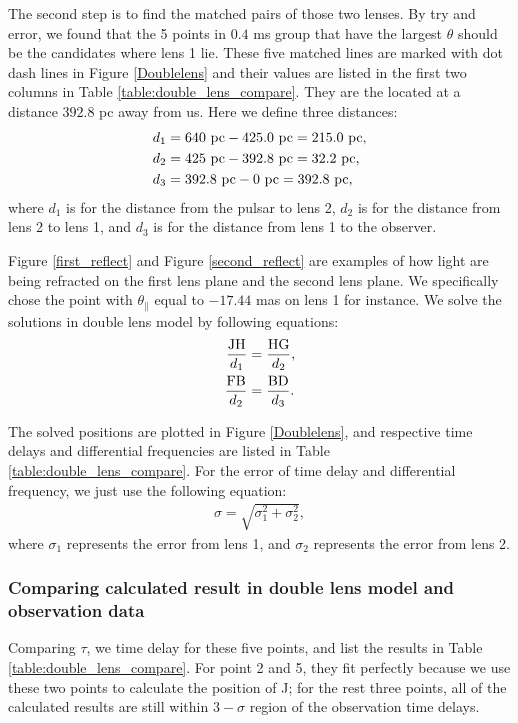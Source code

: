 \documentclass[useAMS,usenatbib]{mn2e}
\begin{document}
The second step is to find the matched pairs of those two lenses. By try and error, we found that the 5 points in $0.4$ ms group that have the largest $\theta$ should be the candidates where lens 1 lie.  These five matched lines are marked with dot dash lines in Figure \ref{Doublelens} and their values are listed in the first two columns in Table \ref{table:double_lens_compare}. They are the located at a distance $392.8$ pc away from us. Here we define three distances:
\begin{align*}
d_1&=640~{\rm pc}-425.0~{\rm pc} =215.0~{\rm pc},\\
d_2&=425~{\rm pc}-392.8~{\rm pc} =32.2~{\rm pc},\\
d_3&=392.8~{\rm pc}- 0~{\rm pc} = 392.8~{\rm pc}, 
\end{align*} 
where $d_1$ is for the distance from the pulsar to lens 2, $d_2$ is for the distance from lens 2 to lens 1, and $d_3$ is for the distance from lens 1 to the observer.

Figure \ref{first_reflect} and Figure \ref{second_reflect} are examples of how light are being refracted on the first lens plane and the second lens plane. We specifically chose the point with $\theta_{\parallel}$ equal to $-17.44$ mas on lens 1 for instance. We solve the solutions in double lens model by following equations:
\begin{align*}
\frac{\rm JH}{d_1}&=\frac{\rm HG}{d_2},\\
\frac{\rm FB}{d_2}&=\frac{\rm BD}{d_3}.
\end{align*}

The solved positions are plotted in Figure \ref{Doublelens}, and respective time delays and differential frequencies are listed in Table \ref{table:double_lens_compare}. For the error of time delay and differential frequency, we just use the following equation: 
\begin{align*}
\sigma = \sqrt{\sigma_1^2+\sigma_2^2},
\end{align*}
where $\sigma_1$ represents the error from lens 1, and $\sigma_2$ represents the error from lens 2.

\subsubsection{Comparing calculated result in double lens model and observation data}
Comparing $\tau$, we time delay for these five points, and list the results in Table \ref{table:double_lens_compare}. For point 2 and 5, they fit perfectly because we use these two points to calculate the position of J; for the rest three points, all of the calculated results are still within $3-\sigma$ region of the observation time delays.
\end{document}
